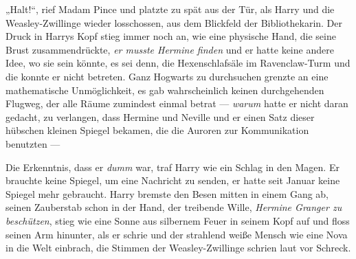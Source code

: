 „Halt!“, rief Madam Pince und platzte zu spät aus der Tür, als Harry und die Weasley-Zwillinge wieder losschossen, aus dem Blickfeld der Bibliothekarin.
Der Druck in Harrys Kopf stieg immer noch an, wie eine physische Hand, die seine Brust zusammendrückte, \emph{er musste Hermine finden} und er hatte keine andere Idee, wo sie sein könnte, es sei denn, die Hexenschlafsäle im Ravenclaw-Turm und die konnte er nicht betreten. Ganz Hogwarts zu durchsuchen grenzte an eine mathematische Unmöglichkeit, es gab wahrscheinlich keinen durchgehenden Flugweg, der alle Räume zumindest einmal betrat — \emph{warum} hatte er nicht daran gedacht, zu verlangen, dass Hermine und Neville und er einen Satz dieser hübschen kleinen Spiegel bekamen, die die Auroren zur Kommunikation benutzten —

Die Erkenntnis, dass er \emph{dumm} war, traf Harry wie ein Schlag in den Magen. Er brauchte keine Spiegel, um eine Nachricht zu senden, er hatte seit Januar keine Spiegel mehr gebraucht. Harry bremste den Besen mitten in einem Gang ab, seinen Zauberstab schon in der Hand, der treibende Wille, \emph{Hermine Granger zu beschützen}, stieg wie eine Sonne aus silbernem Feuer in seinem Kopf auf und floss seinen Arm hinunter, als er  schrie und der strahlend weiße Mensch wie eine Nova in die Welt einbrach, die Stimmen der Weasley-Zwillinge schrien laut vor Schreck.

